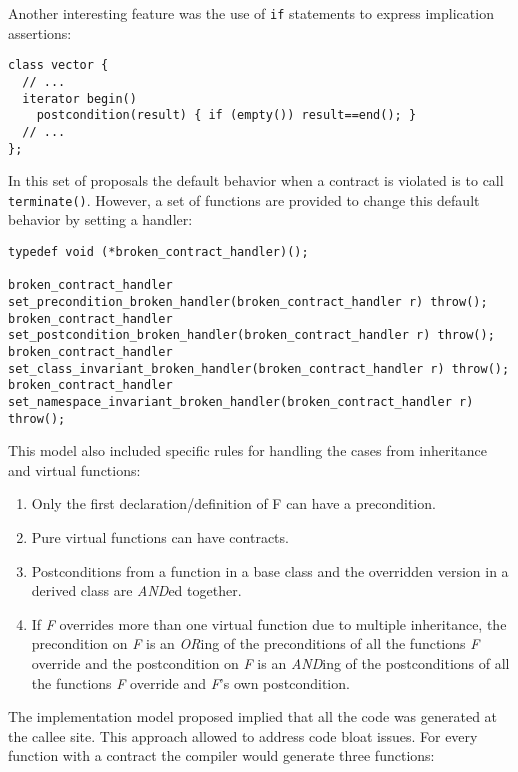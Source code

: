 Another interesting feature was the use of \texttt{if} statements to express
implication assertions:

\begin{lstlisting}[style=cppcontract05]
class vector {
  // ...
  iterator begin()
    postcondition(result) { if (empty()) result==end(); }
  // ...
};
\end{lstlisting}

In this set of proposals the default behavior when a contract is violated is to
call \texttt{terminate()}. However, a set of functions are provided to change
this default behavior by setting a handler:

\begin{lstlisting}
typedef void (*broken_contract_handler)();
    
broken_contract_handler set_precondition_broken_handler(broken_contract_handler r) throw();
broken_contract_handler set_postcondition_broken_handler(broken_contract_handler r) throw();
broken_contract_handler set_class_invariant_broken_handler(broken_contract_handler r) throw();
broken_contract_handler set_namespace_invariant_broken_handler(broken_contract_handler r) throw();
\end{lstlisting}

This model also included specific rules for handling the cases from inheritance
and virtual functions:

\begin{enumerate}

\item Only the first declaration/definition of F can have a precondition.

\item Pure virtual functions can have contracts.

\item Postconditions from a function in a base class and the overridden version
in a derived class are \emph{AND}ed together.

\item If \emph{F} overrides more than one virtual function due to multiple
inheritance, the precondition on \emph{F} is an \emph{OR}ing of the
preconditions of all the functions \emph{F} override and the postcondition on
\emph{F} is an \emph{AND}ing of the postconditions of all the functions \emph{F}
override and \emph{F}'s own postcondition.  \end{enumerate}

The implementation model proposed implied that all the code was generated at the
callee site. This approach allowed to address code bloat issues. For every
function with a contract the compiler would generate three functions:

